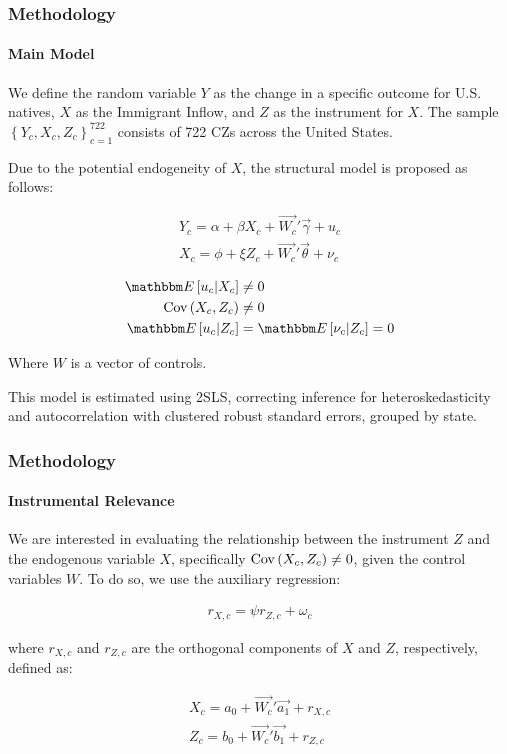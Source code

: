 

\begin{frame}
    \frametitle{Methodology}
    \framesubtitle{Main Model}

    We define the random variable $Y$ as the change in a specific outcome for U.S. natives, $X$ as the Immigrant Inflow, and $Z$ as the instrument for $X$. The sample $\left\{Y_c, X_c, Z_c\right\}_{c = 1}^{722}$ consists of 722 CZs across the United States.
    
    Due to the potential endogeneity of $X$, the structural model is proposed as follows:

    \begin{align}
        Y_c = \alpha +  \beta X_c + \Vec{W_c}'\Vec{\gamma} + u_c \\
        X_c = \phi + \xi Z_c + \Vec{W_c}'\Vec{\theta} + \nu_c\\
    \end{align}
    \begin{align}
        \E{u_c | X_c} &\neq 0 \\
        \cov{X_c, Z_c} &\neq 0 \\
        \E{u_c | Z_c} &= \E{\nu_c | Z_c} = 0
    \end{align}

    Where $W$ is a vector of controls.
    
    This model is estimated using 2SLS, correcting inference for heteroskedasticity and autocorrelation with clustered robust standard errors, grouped by state.
\end{frame}


\begin{frame}
    \frametitle{Methodology}
    \framesubtitle{Instrumental Relevance}
    We are interested in evaluating the relationship between the instrument $Z$ and the endogenous variable $X$, specifically $\text{Cov}\left(X_c, Z_c\right) \neq 0$, given the control variables $W$. To do so, we use the auxiliary regression:

    \begin{align}
        r_{X,c} = \psi r_{Z,c} + \omega_{c}
        \label{eq:auxiliary}
    \end{align}
    
    where $r_{X,c}$ and $r_{Z,c}$ are the orthogonal components of $X$ and $Z$, respectively, defined as:
    
    \begin{align}
        X_c = a_0 + \Vec{W_c}'\Vec{a_1} + r_{X,c} \\
        Z_c = b_0 + \Vec{W_c}'\Vec{b_1} + r_{Z,c}
    \end{align}
    
\end{frame}

